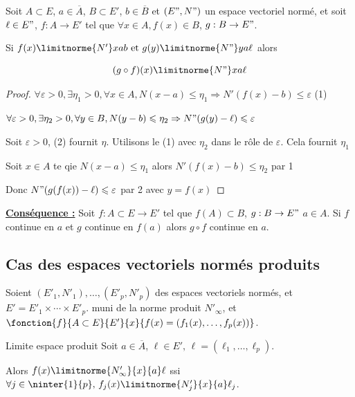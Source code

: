 \begin{proposition}{}{}
    Soit $A \subset E$, $a \in \overline A$, $B \subset E'$, $b \in \overline B$ et 
    $(E", N")$ un espace vectoriel normé, et soit $\ell \in E"$, $f : A \to E'$ tel que $\forall x \in A, f(x) \in B$, $g: B \to E"$. 

    Si $f(x) \limitnorme{N'}x a b \text{ et } g(y) \limitnorme{N"}y a \ell$ alors 

    $$(g \circ f )(x) \limitnorme{N"} x a \ell$$
\end{proposition}

\begin{proof}
    $\forall \varepsilon > 0, \exists \eta_1 > 0, \forall x \in A, N(x - a) \leqslant \eta_1 \Rightarrow N'(f(x) - b) \leqslant \varepsilon$ (1)

    $\forall \varepsilon > 0, \exists \eta_2 > 0, \forall y \in B, N(y - b) \leqslant \eta_2 \Rightarrow N"(g(y) - \ell) \leqslant \varepsilon$

    Soit $\varepsilon > 0$, (2) fournit $\eta$. Utilisons le (1) avec $\eta_2$ dans le rôle 
    de $\varepsilon$. Cela fournit $\eta_1$

    Soit $x \in A$ te qie $N(x - a) \leqslant \eta_1$ alors $N'(f(x) - b) \leqslant \eta_2$ par 1

    Donc $N"(g(f(x)) - \ell) \leqslant \varepsilon$ par 2 avec $y = f(x)$
\end{proof}

\textbf{\uline{Conséquence :}}
Soit $f : A \subset E \to E'$ tel que $f(A) \subset B$, $g : B \to E"$ $a \in A$. Si $f$ continue en $a$ et $g$ continue en $f(a)$ alors $g \circ f$ continue en $a$.

\subsection{Cas des espaces vectoriels normés produits}

Soient $(E'_1, N'_1), \ldots, (E'_p, N'_p)$ des espaces vectoriels normés, et $E' = E'_1 \times \cdots \times E'_p$.
muni de la norme produit $N'_\infty$, et $\fonction{f}{A\subset E}{E'}{x}{f(x) = (f_1(x), \ldots, f_p(x))}$.


\begin{proposition}{Limite espace produit}{}
    Soit $a \in \overline A$, $\ell \in E', \, \ell = (\ell_1, \ldots, \ell_p)$.

    Alors $f(x) \limitnorme{N'_\infty}{x}{a} \ell$ ssi $\forall j \in \ninter{1}{p}, \, f_j(x) \limitnorme{N'_j}{x}{a} \ell_j$.

\end{proposition}

